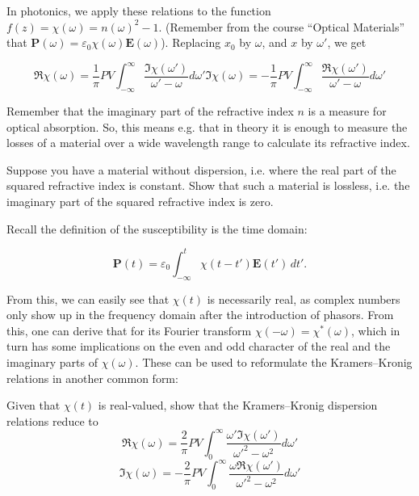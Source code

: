 In photonics, we apply these relations to the function $f(z) = \chi(\omega) =
n(\omega)^2 -1$. (Remember from the course ``Optical Materials'' that
$\mathbf{P}(\omega)=\varepsilon_0 \chi(\omega) \mathbf{E}(\omega)$). Replacing
$x_0$ by $\omega$, and $x$ by $\omega'$, we get

\begin{subequations} 
\begin{equation}
\Re \chi(\omega) = \frac{1}{\pi} PV \int_{- \infty}^{\infty} \frac{\Im
\chi(\omega')}{\omega'-\omega}d\omega'
\end{equation} 
\begin{equation}
\Im \chi(\omega) = -\frac{1}{\pi} PV \int_{- \infty}^{\infty} \frac{\Re
\chi(\omega')}{\omega'-\omega}d\omega'
\end{equation}
\label{eq-KK-2}
\end{subequations}

Remember that the imaginary part of the refractive index $n$ is a measure for
optical absorption. So, this means e.g. that in theory it is enough to measure
the losses of a material over a wide wavelength range to calculate its
refractive index.

\begin{sidebar}
\begin{ex}
Suppose you have a material without dispersion, i.e. where the real part of the squared refractive index is constant. Show that such a material is lossless, i.e. the imaginary part of the squared refractive index is zero.
\end{ex}
\end{sidebar}

Recall the definition of the susceptibility is the time domain:

\begin{equation}
\mathbf{P}(t)=\varepsilon_0 \int_{-\infty}^t \chi(t-t') \mathbf{E}(t')\, dt'.
\end{equation}

From this, we can easily see that $\chi(t)$ is necessarily real, as complex
numbers only show up in the frequency domain after the introduction of phasors.
From this, one can derive that for its Fourier transform $\chi(-\omega) =
\chi^*(\omega)$, which in turn has some implications on the even and odd
character of the real and the imaginary parts of $\chi(\omega)$. These can be
used to reformulate the Kramers--Kronig relations in another common form:

\begin{sidebar}
\begin{ex}
Given that $\chi(t)$ is real-valued, show that the Kramers--Kronig dispersion relations reduce to
$$\Re \chi(\omega) =  \frac{2}{\pi} PV \int_{0}^{\infty}{ \frac{\omega'\Im \chi(\omega')}{\omega'^2-\omega^2}d\omega'}$$
$$\Im \chi(\omega) = -\frac{2}{\pi} PV \int_{0}^{\infty}{ \frac{\omega \Re \chi(\omega')}{\omega'^2-\omega^2}d\omega'}$$
\end{ex}
\end{sidebar}

